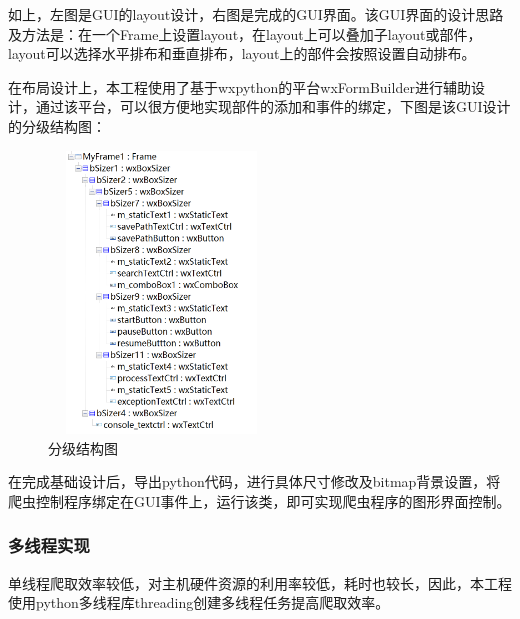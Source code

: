 \documentclass[UTF-8,a4paper, 12pt]{article}
\numberwithin{equation}{section}
\begin{document}
如上，左图是GUI的layout设计，右图是完成的GUI界面。该GUI界面的设计思路及方法是：在一个Frame上设置layout，在layout上可以叠加子layout或部件，layout可以选择水平排布和垂直排布，layout上的部件会按照设置自动排布。

在布局设计上，本工程使用了基于wxpython的平台wxFormBuilder进行辅助设计，通过该平台，可以很方便地实现部件的添加和事件的绑定，下图是该GUI设计的分级结构图：
\begin{figure}[!htbp]
  \centering
  \includegraphics[width=6cm,height=7.5cm]{structure}
  \caption{分级结构图}\label{structure}
\end{figure}

在完成基础设计后，导出python代码，进行具体尺寸修改及bitmap背景设置，将爬虫控制程序绑定在GUI事件上，运行该类，即可实现爬虫程序的图形界面控制。

\subsubsection{多线程实现}
单线程爬取效率较低，对主机硬件资源的利用率较低，耗时也较长，因此，本工程使用python多线程库threading创建多线程任务提高爬取效率。
\end{document}
